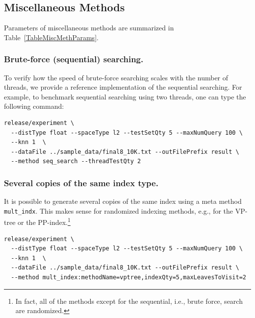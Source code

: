 \documentclass[runningheads,a4paper]{llncs}
\newcommand{\ttt}[1]{\texttt{#1}}
\begin{document}
\subsection{Miscellaneous Methods} \label{SectionMiscMeth}
Parameters of miscellaneous methods are summarized in Table~\ref{TableMiscMethParams}. 

\subsubsection{\textbf{Brute-force (sequential) searching}.}
To verify how the speed of brute-force searching
scales with the number of threads,
we provide a reference implementation of the sequential
searching.
For example, to benchmark sequential searching using two threads, 
one can type the following command:
{
\footnotesize
\begin{verbatim}
release/experiment \
  --distType float --spaceType l2 --testSetQty 5 --maxNumQuery 100 \
  --knn 1  \
  --dataFile ../sample_data/final8_10K.txt --outFilePrefix result \
  --method seq_search --threadTestQty 2
\end{verbatim}
}

\subsubsection{\textbf{Several copies of the same index type}.}
It is possible to generate several copies of the same index using a
meta method \ttt{mult\_indx}.
This makes sense for randomized indexing methods, e.g., for the VP-tree
or the PP-index.\footnote{In fact, all of the methods except for the sequential, i.e.,
brute force, search are randomized.}

{
\footnotesize
\begin{verbatim}
release/experiment \
  --distType float --spaceType l2 --testSetQty 5 --maxNumQuery 100 \
  --knn 1  \
  --dataFile ../sample_data/final8_10K.txt --outFilePrefix result \
  --method mult_index:methodName=vptree,indexQty=5,maxLeavesToVisit=2
\end{verbatim}
}
\end{document}
